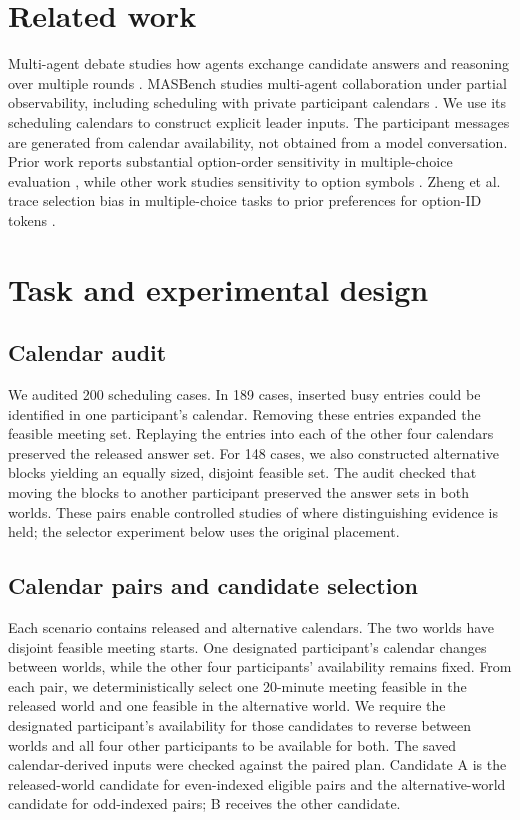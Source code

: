 \documentclass[letterpaper]{article}
\begin{document}
\section{Related work}

Multi-agent debate studies how agents exchange candidate answers and reasoning over multiple rounds \cite{du2024debate}. MASBench studies multi-agent collaboration under partial observability, including scheduling with private participant calendars \cite{chu2026masbench}. We use its scheduling calendars to construct explicit leader inputs. The participant messages are generated from calendar availability, not obtained from a model conversation. Prior work reports substantial option-order sensitivity in multiple-choice evaluation \cite{pezeshkpour2024order}, while other work studies sensitivity to option symbols \cite{yang2025symbol}. Zheng et al. trace selection bias in multiple-choice tasks to prior preferences for option-ID tokens \cite{zheng2024selectors}.

\section{Task and experimental design}

\subsection{Calendar audit}

We audited 200 scheduling cases. In 189 cases, inserted busy entries could be identified in one participant's calendar. Removing these entries expanded the feasible meeting set. Replaying the entries into each of the other four calendars preserved the released answer set. For 148 cases, we also constructed alternative blocks yielding an equally sized, disjoint feasible set. The audit checked that moving the blocks to another participant preserved the answer sets in both worlds. These pairs enable controlled studies of where distinguishing evidence is held; the selector experiment below uses the original placement.

\subsection{Calendar pairs and candidate selection}

Each scenario contains released and alternative calendars. The two worlds have disjoint feasible meeting starts. One designated participant's calendar changes between worlds, while the other four participants' availability remains fixed. From each pair, we deterministically select one 20-minute meeting feasible in the released world and one feasible in the alternative world. We require the designated participant's availability for those candidates to reverse between worlds and all four other participants to be available for both. The saved calendar-derived inputs were checked against the paired plan. Candidate A is the released-world candidate for even-indexed eligible pairs and the alternative-world candidate for odd-indexed pairs; B receives the other candidate.
\end{document}
